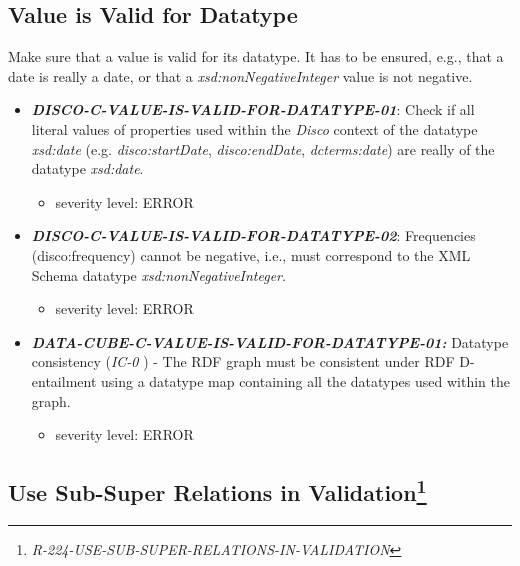 \documentclass{llncs}
\begin{document}
\subsection{Value is Valid for Datatype}

Make sure that a value is valid for its datatype.
It has to be ensured, e.g., that a date is really a date, or that a \emph{xsd:nonNegativeInteger} value is not negative. 

\begin{itemize}
	\item \textbf{{\em DISCO-C-VALUE-IS-VALID-FOR-DATATYPE-01}}: 
	Check if all literal values of properties used within the \emph{Disco} context of the datatype {\em xsd:date} (e.g. {\em disco:startDate}, {\em disco:endDate}, {\em dcterms:date}) are really of the datatype {\em xsd:date}.
	\begin{itemize}
		\item severity level: ERROR
	\end{itemize}
	\item \textbf{{\em DISCO-C-VALUE-IS-VALID-FOR-DATATYPE-02}}: 
	Frequencies (disco:frequency) cannot be negative, i.e., must correspond  to the XML Schema datatype \emph{xsd:nonNegativeInteger}.
	\begin{itemize}
		\item severity level: ERROR
	\end{itemize}
\end{itemize}

\begin{itemize}
	\item \textbf{{\em DATA-CUBE-C-VALUE-IS-VALID-FOR-DATATYPE-01:}}
	Datatype consistency (\emph{IC-0} \cite{CyganiakReynolds2014}) -  
	The RDF graph must be consistent under RDF D-entailment using a datatype map containing all the datatypes used within the graph. 
	\begin{itemize}
		\item severity level: ERROR
	\end{itemize}
\end{itemize}

\subsection[Use Sub-Super Relations in Validation] {Use Sub-Super Relations in Validation\footnote{\emph{R-224-USE-SUB-SUPER-RELATIONS-IN-VALIDATION}}}

\end{document}
